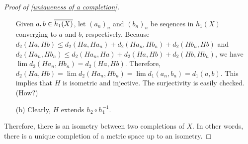 \begin{proof}[Proof of \cref{uniqueness of a completion}]
\begin{enumerate}
        {
            Given $a, b\in\overline{h_1(X)}$, let $(a_n)_n$ and $(b_n)_n$ be seqences in $h_1(X)$ converging to $a$ and $b$, respectively.
            Because $d_2(Ha, Hb)\leq d_2(Ha, Ha_n)+d_2(Ha_n, Hb_n)+d_2(Hb_n, Hb)$ and $d_2(Ha_n, Hb_n)\leq d_2(Ha_n, Ha)+d_2(Ha, Hb)+d_2(Hb, Hb_n)$, we have $\lim d_2(Ha_n, Hb_n)=d_2(Ha, Hb)$.
            Therefore, $d_2(Ha, Hb)=\lim d_2(Ha_n, Hb_n)=\lim d_1(a_n, b_n)=d_1(a, b)$.
            This implies that $H$ is isometric and injective.
            The surjectivity is easily checked. (How?)
        }
        \item[(b)]
        {
            Clearly, $H$ extends $h_2\circ h_1^{-1}$.
        }
    \end{enumerate}
    Therefore, there is an isometry between two completions of $X$.
    In other words, there is a unique completion of a metric space up to an isometry.
\end{proof}